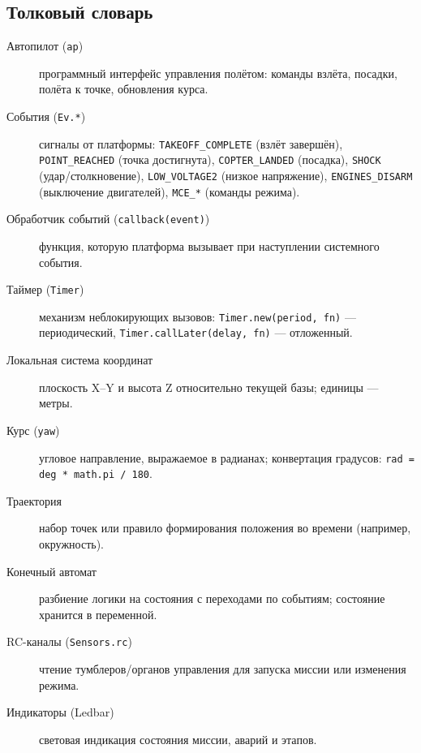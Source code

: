 \subsection{Толковый словарь}
\begin{description}
  \item[Автопилот (\texttt{ap})] программный интерфейс управления полётом: команды взлёта, посадки, полёта к точке, обновления курса.
  \item[События (\texttt{Ev.*})] сигналы от платформы: \texttt{TAKEOFF\_COMPLETE} (взлёт завершён), \texttt{POINT\_REACHED} (точка достигнута), \texttt{COPTER\_LANDED} (посадка), \texttt{SHOCK} (удар/столкновение), \texttt{LOW\_VOLTAGE2} (низкое напряжение), \texttt{ENGINES\_DISARM} (выключение двигателей), \texttt{MCE\_*} (команды режима).
  \item[Обработчик событий (\texttt{callback(event)})] функция, которую платформа вызывает при наступлении системного события.
  \item[Таймер (\texttt{Timer})] механизм неблокирующих вызовов: \texttt{Timer.new(period, fn)} — периодический, \texttt{Timer.callLater(delay, fn)} — отложенный.
  \item[Локальная система координат] плоскость X–Y и высота Z относительно текущей базы; единицы — метры.
  \item[Курс (\texttt{yaw})] угловое направление, выражаемое в радианах; конвертация градусов: \texttt{rad = deg * math.pi / 180}.
  \item[Траектория] набор точек или правило формирования положения во времени (например, окружность).
  \item[Конечный автомат] разбиение логики на состояния с переходами по событиям; состояние хранится в переменной.
  \item[RC-каналы (\texttt{Sensors.rc})] чтение тумблеров/органов управления для запуска миссии или изменения режима.
  \item[Индикаторы (Ledbar)] световая индикация состояния миссии, аварий и этапов.
\end{description}
